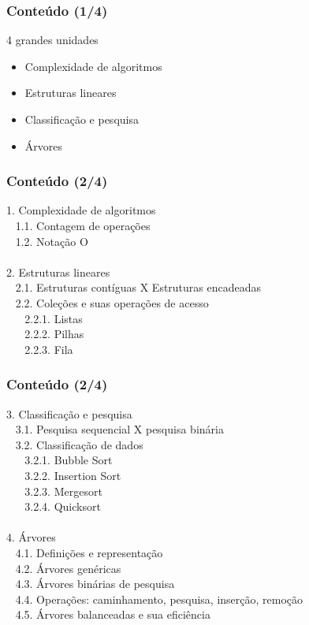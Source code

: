 \documentclass[aspectratio=169]{beamer}
\begin{document}
\begin{frame}\frametitle{Conte\'udo (1/4)}
4 grandes unidades
\begin{itemize}
	\item Complexidade de algoritmos
	\item Estruturas lineares
	\item Classificação e pesquisa
	\item Árvores
\end{itemize}
\end{frame}

\begin{frame}\frametitle{Conte\'udo (2/4)}
\small{1. Complexidade de algoritmos\\
~ 1.1. Contagem de operações\\
~ 1.2. Notação O\\
~\\
2. Estruturas lineares\\
~ 2.1. Estruturas contíguas X Estruturas encadeadas\\
~ 2.2. Coleções e suas operações de acesso\\
~ ~ 2.2.1. Listas\\
~ ~ 2.2.2. Pilhas\\
~ ~ 2.2.3. Fila}
\end{frame}

\begin{frame}\frametitle{Conte\'udo (2/4)}
\small{3. Classificação e pesquisa\\
~ 3.1. Pesquisa sequencial X pesquisa binária\\
~ 3.2. Classificação de dados\\
~ ~ 3.2.1. Bubble Sort\\
~ ~ 3.2.2. Insertion Sort\\
~ ~ 3.2.3. Mergesort\\
~ ~ 3.2.4. Quicksort\\
~\\
4. Árvores\\
~ 4.1. Definições e representação\\
~ 4.2. Árvores genéricas\\
~ 4.3. Árvores binárias de pesquisa\\
~ 4.4. Operações: caminhamento, pesquisa, inserção, remoção\\
~ 4.5. Árvores balanceadas e sua eficiência}
\end{frame}
\end{document}
